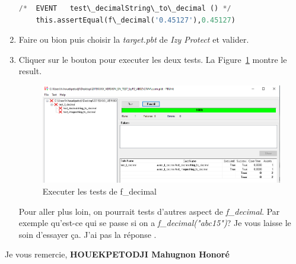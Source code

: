 \documentclass[french]{article}
\theoremstyle{definition}
\begin{document}
\begin{enumerate}
\begin{lstlisting}[language=Python, caption= f\_decimal test 2]
    /*	EVENT	test\_decimalString\_to\_decimal ()	*/
    this.assertEqual(f\_decimal('0.45127'),0.45127)
\end{lstlisting}
\item  Faire  ou bion  puis choisir la \textit{target.pbt} de \textit{Izy Protect} et valider.
\item Cliquer sur le bouton  pour executer les deux tests. La Figure~\ref{fig:testPass} montre le result. 
\begin{figure}[!htbp]
    \begin{center}
    \includegraphics[width=.8\linewidth]{./uf_decimal_tests_pass.png}
    \caption{Executer les tests de f\_decimal}
    \label{fig:testPass}
    \end{center}
  \end{figure}
  Pour aller plus loin, on pourrait tests d'autres aspect de \textit{f\_decimal}. 
  Par exemple qu'est-ce qui se passe si on a \textit{f\_decimal("abc15")}?
 Je vous laisse le soin d'essayer ça.
  J'ai pas la réponse \smiley.
\end{enumerate}
  
\newpage
Je vous remercie, \textbf{HOUEKPETODJI Mahugnon Honoré}
% 
% 
\end{document}
